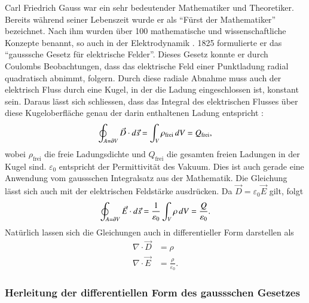 Carl Friedrich Gauss war ein sehr bedeutender Mathematiker und Theoretiker.
%
Bereits während seiner Lebenszeit wurde er als ``Fürst der Mathematiker'' bezeichnet.
%
Nach ihm wurden über 100 mathematische und wissenschaftliche Konzepte benannt, so auch in der Elektrodynamik \cite{maxwell:Carl_Friedrich_Gauß}.
1825 formulierte er das ``gausssche Gesetz für elektrische Felder''.
Dieses Gesetz konnte er durch Coulombs Beobachtungen, dass das elektrische Feld einer Punktladung radial quadratisch abnimmt, folgern.
Durch diese radiale Abnahme muss auch der elektrisch Fluss durch eine Kugel, in der die Ladung eingeschlossen ist, konstant sein.
Daraus lässt sich schliessen, dass das Integral des elektrischen Flusses über diese Kugeloberfläche genau der darin enthaltenen Ladung entspricht \cite{maxwell:Gaußscher_Integralsatz}:
\begin{equation}
\label{maxwell:equasion:elektrisch}
\oint_{A=\d V} \vec{D} \cdot d\vec{s}
=
\int_{V} \rho_{\text{frei}}\, dV
=
Q_{\text{frei}} ,
\end{equation}
wobei $\rho_{\text{frei}}$ die freie Ladungsdichte und $Q_{\text{frei}}$ die gesamten freien Ladungen in der Kugel sind. $\varepsilon_0$ entspricht der Permittivität des Vakuum. Dies ist auch gerade eine Anwendung vom gaussschen Integralsatz aus der Mathematik.
Die Gleichung lässt sich auch mit der elektrischen Feldstärke ausdrücken. Da $\vec{D} = \varepsilon_0 \vec{E}$ gilt, folgt
\[
\oint_{A=\d V} \vec{E} \cdot d\vec{s}
=
\frac{1}{\varepsilon_0}\int_{V} \rho\, dV
=
\frac{Q}{\varepsilon_0} .
\]
Natürlich lassen sich die Gleichungen auch in differentieller Form darstellen als
\begin{align}
	\nabla \cdot \vec{D}
	&=
	\rho
	\label{maxwell:equation:gauss}
	\\
	\nabla \cdot \vec{E}
	&=
	\frac{\rho}{\varepsilon_0} .
\end{align}

\subsubsection{Herleitung der differentiellen Form des gaussschen Gesetzes}

